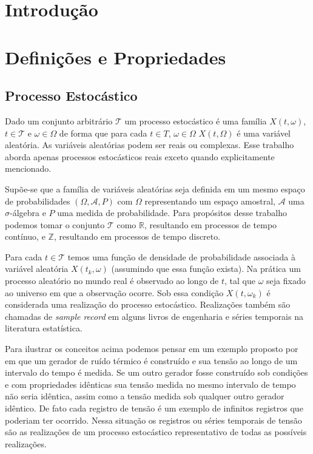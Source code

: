 \chapter*{Introdução}
\label{sec:teorica_classica_series_temporais_introducao}

\chapter{Definições e Propriedades}
\label{sec:teorica_classica_series_temporais_definicoes}

\section{Processo Estocástico}

Dado um conjunto arbitrário $\mathcal{T}$ um processo estocástico é uma família
${X(t,\omega)}$, $ t\in \mathcal{T}$ e $\omega \in \Omega$ de forma que para
cada $t \in T$, $\omega \in \Omega$ $X(t, \Omega)$ é uma variável aleatória. As
variáveis aleatórias podem ser reais ou complexas. Esse trabalho aborda apenas
processos estocásticos reais exceto quando explicitamente mencionado.

Supõe-se que a família de variáveis aleatórias seja definida em um mesmo
espaço de probabilidades $(\Omega, \mathcal{A}, P)$ com $\Omega$ representando
um espaço amostral, $\mathcal{A}$ uma $\sigma$-álgebra e $P$ uma medida de
probabilidade. Para propósitos desse trabalho podemos tomar o conjunto
$\mathcal{T}$ como $\mathbb{R}$, resultando em processos de tempo contínuo, e
$\mathbb{Z}$, resultando em processos de tempo discreto.

Para cada $t \in \mathcal{T}$ temos uma função de densidade de probabilidade
associada à variável aleatória $X(t_k, \omega)$ (assumindo que essa função exista).
Na prática um processo aleatório no mundo real é observado ao longo de $t$, tal que
$\omega$ seja fixado ao universo em que a observação ocorre. Sob essa condição
$X(t, \omega_k)$ é considerada uma realização do processo estocástico. Realizações também
são chamadas de \emph{sample record} em alguns livros de engenharia
e séries temporais na literatura estatística.

Para ilustrar os conceitos acima podemos pensar em um exemplo proposto por
~\cite{random_data} em que um gerador de ruído térmico é construído e sua tensão
ao longo de um intervalo do tempo é medida. Se um outro gerador fosse
construído sob condições e com propriedades idênticas sua tensão medida no
mesmo intervalo de tempo não seria idêntica, assim como a tensão medida sob
qualquer outro gerador idêntico. De fato cada registro de tensão é um exemplo
de infinitos registros que poderiam ter ocorrido. Nessa situação os registros
ou séries temporais de tensão são as realizações de um processo estocástico
representativo de todas as possíveis realizações.

